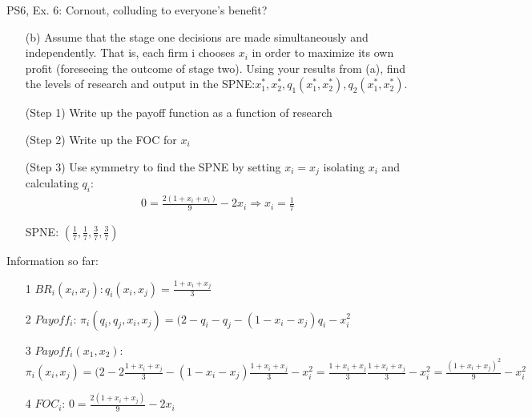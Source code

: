 \begin{frame}{PS6, Ex. 6: Cornout, colluding to everyone's benefit?}
    \begin{itemize}
    \item[(b)] Assume that the stage one decisions are made simultaneously and independently.
That is, each firm i chooses $x_i$ in order to maximize its own profit (foreseeing the
outcome of stage two). Using your results from (a), find the levels of research and
output in the SPNE:$x_1^*,x_2^*,q_1(x_1^*,x_2^*),q_2(x_1^*,x_2^*)$.
    \end{itemize}
    \vfill\null
  \begin{multicols}{2}
    \begin{itemize}
      \item[(Step 1)] Write up the payoff function as a function of research
      \item[(Step 2)] Write up the FOC for $x_i$
      \item[(Step 3)] Use symmetry to find the SPNE by setting $x_i=x_j$ isolating $x_i$ and calculating $q_i$:
      \begin{align*}
          0 = \frac{2(1+x_i+x_i)}{9}-2x_i \Rightarrow x_i=\frac{1}{7}
      \end{align*}
      \item[SPNE:] \begin{math} \left(\frac{1}{7},\frac{1}{7},\frac{3}{7},\frac{3}{7}\right)\end{math}
    \end{itemize}
    \vfill\null \columnbreak
    Information so far:
    \begin{itemize}
    \item[1] $BR_i(x_i,x_j): q_i(x_i,x_j)=\frac{1+x_i+x_j}{3}$
    \item[2] $Payoff_i$: $\pi_i(q_i,q_j,x_i,x_j) = (2-q_i-q_j-(1-x_i-x_j)q_i-x_i^2$ 
    \item[3] $Payoff_i(x_1,x_2)$: $\pi_i(x_i,x_j) = (2-2\frac{1+x_i+x_j}{3}-(1-x_i-x_j)\frac{1+x_i+x_j}{3}-x_i^2 = \frac{1+x_i+x_j}{3}\frac{1+x_i+x_j}{3}-x_i^2 = \frac{(1+x_i+x_j)^2}{9}-x_i^2 $  
    \item[4] $FOC_i$: $0 = \frac{2(1+x_i+x_j)}{9}-2x_i$
    \end{itemize}
    \vfill\null
  \end{multicols}
\end{frame}

